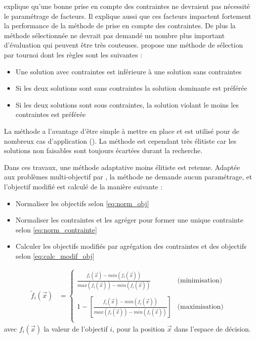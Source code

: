 \cite{Coello2002} explique qu’une bonne prise en compte des contraintes ne devraient
pas nécessité le paramétrage de facteurs. Il explique aussi que ces facteurs impactent
fortement la performance de la méthode de prise en compte des contraintes. De plus
la méthode sélectionnée ne devrait pas demandé un nombre plus important d’évaluation
qui peuvent être très couteuses. \cite{Deb2000311} propose une méthode de
sélection par tournoi dont les règles sont les suivantes :
\begin{itemize}
  \item Une solution avec contraintes est inférieure à une solution sans contraintes
  \item Si les deux solutions sont sans contraintes la solution dominante est préférée
  \item Si les deux solutions sont sous contraintes, la solution violant le moins les contraintes est préférée
\end{itemize}
La méthode a l’avantage d’être simple à mettre en place et est utilisé pour de nombreux
cas d’application (). La méthode est cependant
très élitiste car les solutions non faisables sont toujours écartées durant la
recherche.

Dans ces travaux, une méthode adaptative moins élitiste est retenue. Adaptée
aux problèmes multi-objectif par \cite{Woldesenbet20073077}, la méthode ne demande
aucun paramétrage, et l’objectif modifié est calculé de la manière suivante :
\begin{itemize}
  \item Normaliser les objectifs selon \eqref{eq:norm_obj}
  \item Normaliser les contraintes et les agréger pour former une unique contrainte selon \eqref{eq:norm_contrainte}
  \item Calculer les objectifs modifiés par agrégation des contraintes et des objectifs selon \eqref{eq:calc_modif_obj}
\end{itemize}

\begin{align}\label{eq:norm_obj}
  \tilde{f}_{i}(\vec{x}) &= \begin{cases}
    \frac{f_{i}(\vec{x}) - min(f_{i}(\vec{x}))}{max(f_{i}(\vec{x})) - min(f_{i}(\vec{x}))} & \text{(minimisation)} \\ \\
    1 - \left[\frac{f_{i}(\vec{x}) - min(f_{i}(\vec{x}))}{max(f_{i}(\vec{x})) - min(f_{i}(\vec{x}))}\right] & \text{(maximisation)} \\
  \end{cases}
\end{align}
avec $f_{i}(\vec{x})$ la valeur de l’objectif $i$, pour la position $\vec{x}$ dans l’espace de décision.


